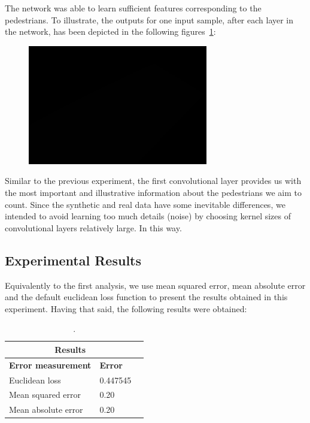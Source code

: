 \noindent The network was able to learn sufficient features corresponding to the pedestrians. To illustrate, the outputs for one input sample, after each layer in the network, has been depicted in the following figures~\ref{fig:feats}: 



\begin{figure}[H]
	\centering
	{\includegraphics[width=0.7\textwidth]{images/1}}
	\caption{}
	\label{fig:feats}
\end{figure}



Similar to the previous experiment, the first convolutional layer provides us with the most important and illustrative information about the pedestrians we aim to count. Since the synthetic and real data have some inevitable differences, we intended to avoid learning too much details (noise) by choosing kernel sizes of convolutional layers relatively large. In this way. 

\subsection{Experimental Results}

Equivalently to the first analysis, we use mean squared error, mean absolute error and the default euclidean loss function to present the results obtained in this experiment. Having that said, the following results were obtained:

\begin{table}[H]
\centering
\small\sffamily
\begin{tabular}{llr}
\multicolumn{2}{c}{\textbf{\textbf{Results}}} \\
\bottomrule
\textbf{Error measurement}        & \textbf{Error} \\
\bottomrule
Euclidean loss           & 0.447545  \\
Mean squared error       & 0.20  \\
Mean absolute error      & 0.20  \\
\bottomrule
\end{tabular}
\caption{.}
\label{tab:res}
\end{table} 


